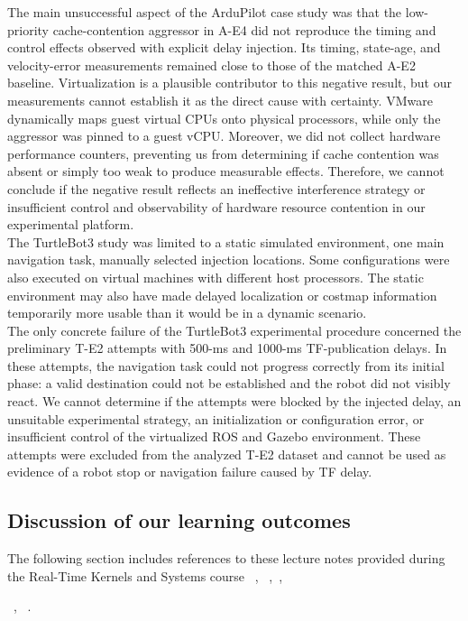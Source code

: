 \noindent The main unsuccessful aspect of the ArduPilot case study was that the low-priority cache-contention aggressor in A-E4 did not reproduce the timing and control effects observed with explicit delay injection. Its timing, state-age, and velocity-error measurements remained close to those of the matched A-E2 baseline. Virtualization is a plausible contributor to this negative result, but our measurements cannot establish it as the direct cause with certainty. VMware dynamically maps guest virtual CPUs onto physical processors, while only the aggressor was pinned to a guest vCPU. Moreover, we did not collect hardware performance counters, preventing us from determining if cache contention was absent or simply too weak to produce measurable effects. Therefore, we cannot conclude if the negative result reflects an ineffective interference strategy or insufficient control and observability of hardware resource contention in our experimental platform.
\\
The TurtleBot3 study was limited to a static simulated environment, one main navigation task, manually selected injection locations. Some configurations were also executed on virtual machines with different host processors. The static environment may also have made delayed localization or costmap information temporarily more usable than it would be in a dynamic scenario.
\\
The only concrete failure of the TurtleBot3 experimental procedure concerned the preliminary T-E2 attempts with 500-ms and 1000-ms TF-publication delays. In these attempts, the navigation task could not progress correctly from its initial phase: a valid destination could not be established and the robot did not visibly react. We cannot determine if the attempts were blocked by the injected delay, an unsuitable experimental strategy, an initialization or configuration error, or insufficient control of the virtualized ROS and Gazebo environment. These attempts were excluded from the analyzed T-E2 dataset and cannot be used as evidence of a robot stop or navigation failure caused by TF delay.

\subsection{Discussion of our learning outcomes}
The following section includes references to these lecture notes provided during the Real-Time Kernels and Systems course ~\cite{T01}, ~\cite{T01-dep},~\cite{T09}, 

\noindent ~\cite{T10}, ~\cite{T11}.

